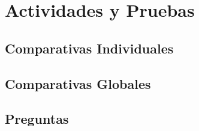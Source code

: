 \documentclass[12pt, fleqn]{article}                             %
\theoremstyle{break}                                            %
\begin{document}
\clearpage
\section{Actividades y Pruebas}


    \subsection{Comparativas Individuales}


    \subsection{Comparativas Globales}


    \subsection{Preguntas}
\end{document}
